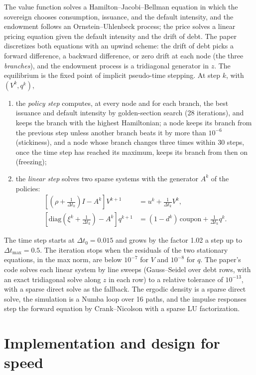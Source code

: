 \documentclass[11pt]{article}
\begin{document}
The value function solves a Hamilton--Jacobi--Bellman equation in which the sovereign chooses consumption, issuance, and the default intensity, and the endowment follows an Ornstein--Uhlenbeck process; the price solves a linear pricing equation given the default intensity and the drift of debt. The paper discretizes both equations with an upwind scheme: the drift of debt picks a forward difference, a backward difference, or zero drift at each node (the three \emph{branches}), and the endowment process is a tridiagonal generator in $z$. The equilibrium is the fixed point of implicit pseudo-time stepping. At step $k$, with $(V^k,q^k)$,
\begin{enumerate}
\item the \emph{policy step} computes, at every node and for each branch, the best issuance and default intensity by golden-section search (28 iterations), and keeps the branch with the highest Hamiltonian; a node keeps its branch from the previous step unless another branch beats it by more than $10^{-6}$ (stickiness), and a node whose branch changes three times within 30 steps, once the time step has reached its maximum, keeps its branch from then on (freezing);
\item the \emph{linear step} solves two sparse systems with the generator $A^k$ of the policies:
\begin{align*}
\left[(\rho + \tfrac1{\Delta t_k}) I - A^k\right] V^{k+1} &= u^k + \tfrac{1}{\Delta t_k} V^k, \\
\left[\mathrm{diag}(\xi^k + \tfrac1{\Delta t_k}) - A^k\right] q^{k+1} &= (1-d^k)\,\text{coupon} + \tfrac1{\Delta t_k} q^k .
\end{align*}
\end{enumerate}
The time step starts at $\Delta t_0=0.015$ and grows by the factor 1.02 a step up to $\Delta t_{\max}=0.5$. The iteration stops when the residuals of the two stationary equations, in the max norm, are below $10^{-7}$ for $V$ and $10^{-8}$ for $q$. The paper's code solves each linear system by line sweeps (Gauss--Seidel over debt rows, with an exact tridiagonal solve along $z$ in each row) to a relative tolerance of $10^{-13}$, with a sparse direct solve as the fallback. The ergodic density is a sparse direct solve, the simulation is a Numba loop over 16 paths, and the impulse responses step the forward equation by Crank--Nicolson with a sparse LU factorization.

\section{Implementation and design for speed}
\label{sec:impl}
\end{document}
